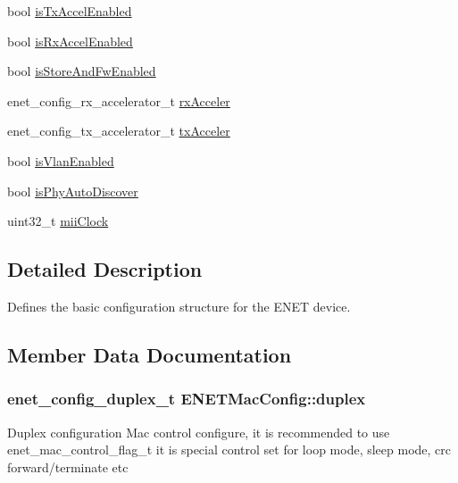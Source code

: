 \begin{DoxyCompactItemize}
\item 
bool \hyperlink{structENETMacConfig_a9499feebf7cc1965e97d2d0c41d6c7e5}{is\+Tx\+Accel\+Enabled}
\item 
bool \hyperlink{structENETMacConfig_a219df26a22f8580a9bf23439a35b7f80}{is\+Rx\+Accel\+Enabled}
\item 
bool \hyperlink{structENETMacConfig_a8b4dd0732ef2e5bb0288d1aa0d226420}{is\+Store\+And\+Fw\+Enabled}
\item 
enet\+\_\+config\+\_\+rx\+\_\+accelerator\+\_\+t \hyperlink{structENETMacConfig_af29e92d609ebad99373f9408246dcfbf}{rx\+Acceler}
\item 
enet\+\_\+config\+\_\+tx\+\_\+accelerator\+\_\+t \hyperlink{structENETMacConfig_a463f21ee128ef777b328a6c50b186211}{tx\+Acceler}
\item 
bool \hyperlink{structENETMacConfig_a2162f6b3dabc2fd72e1789f9e5268d5a}{is\+Vlan\+Enabled}
\item 
bool \hyperlink{structENETMacConfig_a10e0483e6fbe5c7eb797f93405851f58}{is\+Phy\+Auto\+Discover}
\item 
uint32\+\_\+t \hyperlink{structENETMacConfig_a5f4e1022f95e0e358d01da53315198db}{mii\+Clock}
\end{DoxyCompactItemize}


\subsection{Detailed Description}
Defines the basic configuration structure for the E\+N\+ET device. 

\subsection{Member Data Documentation}
\subsubsection[{\texorpdfstring{duplex}{duplex}}]{\setlength{\rightskip}{0pt plus 5cm}enet\+\_\+config\+\_\+duplex\+\_\+t E\+N\+E\+T\+Mac\+Config\+::duplex}\hypertarget{structENETMacConfig_aaaa9c5ef969c036951ea363057a0b99c}{}\label{structENETMacConfig_aaaa9c5ef969c036951ea363057a0b99c}
Duplex configuration Mac control configure, it is recommended to use enet\+\_\+mac\+\_\+control\+\_\+flag\+\_\+t it is special control set for loop mode, sleep mode, crc forward/terminate etc 
